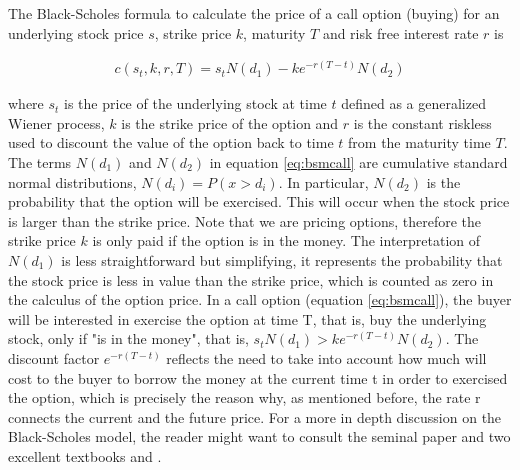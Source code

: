 \documentclass[11pt, onecolumn]{article}
\begin{document}
The Black-Scholes formula to calculate the price of a call option (buying) for an underlying stock  price $s$, strike price $k$, maturity $T$ and risk free interest rate $r$ is 

\begin{equation}
\begin{split}
 c(s_t,k,r,T)  = s_t N(d_1) - k e^{-r(T-t)}N(d_2)
 \end{split}
  \label{eq:bsmcall}
\end{equation}
 
where $s_t$ is the price of the underlying stock at time $t$ defined as a generalized Wiener process, $k$ is the strike price of the option and $r$ is the constant riskless used to discount the value of the option back to time $t$ from the maturity time $T$.
The terms $N(d_1)$ and $N(d_2)$ in equation \ref{eq:bsmcall} are cumulative standard normal distributions, $N(d_i) = P(x > d_i)$. In particular, $N(d_2)$ is the probability that the option will be exercised. This will occur when the stock price is larger than the strike price. Note that we are pricing options, therefore the strike price $k$ is only paid if the option is in the money. The interpretation of $N(d_1)$ is less straightforward but simplifying, it represents the probability that the stock price is less in value than the strike price, which is counted as zero in the calculus of the option price. In a call option (equation \ref{eq:bsmcall}), the buyer will be interested in exercise the option at time T, that is, buy the underlying stock, only if "is in the money", that is, $s_t N(d_1) > k e^{-r(T-t)}N(d_2)$. The discount factor $e^{-r(T-t)}$ reflects the need to take into account how much will cost to the buyer to borrow the money at the current time t in order to exercised the option, which is precisely the reason why, as mentioned before, the rate r connects the current and the future price. For a more in depth discussion on the Black-Scholes model, the reader might want to consult the seminal paper \citep{black_pricing_1973} and two excellent textbooks \citep{hull_options_2005} and \citep{duffie_dynamic_2001}.

\end{document}
